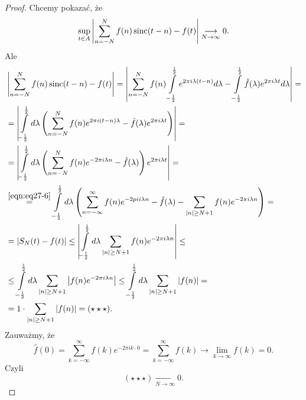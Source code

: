 \documentclass[../main.tex]{subfiles}
\begin{document}
\begin{proof}
    Chcemy pokazać, że
    \[
        \underset{t\in A}{\sup} \left| \sum_{n=-N}^{N} f(n) \operatorname{sinc}(t-n) - f(t) \right| \underset{N\to\infty}{\longrightarrow} 0
    .\]
Ale
\begin{align*}
    &\left| \sum_{n=-N}^{N} f(n) \operatorname{sinc}(t-n) - f(t) \right| = \left| \sum_{n=-N}^{N} f(n) \int\limits_{-\frac{1}{2}}^{\frac{1}{2}} e^{2\pi i \lambda (t-n)}d\lambda - \int\limits_{-\frac{1}{2}}^{\frac{1}{2}} \hat{f}(\lambda)e^{2\pi i \lambda t} d\lambda \right| = \\
    &= \left| \int\limits_{-\frac{1}{2}}^{\frac{1}{2}} d\lambda \left( \sum_{n=-N}^{N} f(n)e^{2\pi i (t - n)\lambda} - \hat{f}(\lambda)e^{2\pi i \lambda t}\right)   \right| = \\
    &= \left| \int\limits_{-\frac{1}{2}}^{\frac{1}{2}} d\lambda \left( \sum_{n=-N}^{N} f(n)e^{- 2\pi i \lambda n} - \hat{f}(\lambda) \right) e^{2\pi i \lambda t}  \right| = \\
    & \overset{\eqref{eqn:eq27-6}}{=} \int\limits_{-\frac{1}{2}}^{\frac{1}{2}} d\lambda \left( \sum_{n=-\infty}^{\infty} f(n) e^{-2pi i \lambda n} - \hat{f}(\lambda) - \sum_{|n| \ge N + 1} f(n) e^{-2\pi i \lambda n} \right) = \\
    &= \left| S_N(t) - f(t) \right| \le \left| \int\limits_{-\frac{1}{2}}^{\frac{1}{2}} d\lambda \sum_{|n| \ge N + 1} f(n)e^{-2\pi i \lambda n}  \right| \le\\
    &\le \int\limits_{-\frac{1}{2}}^{\frac{1}{2}} d\lambda \sum_{|n| \ge N + 1} \left| f(n) e^{-2\pi i \lambda n} \right| \le \int\limits_{-\frac{1}{2}}^{\frac{1}{2}} d\lambda \sum_{|n| \ge N + 1} \left| f(n) \right| =\\
    &= 1 \cdot \sum_{|n| \ge N + 1}\left| f(n) \right| = (\star\star\star)
.\end{align*}
Zauważmy, że
\[
    \hat{f}(0) = \sum_{k = -\infty}^{\infty} f(k) e^{-2\pi i k \cdot 0}= \sum_{k = -\infty}^{\infty} f(k) \to \lim_{k \to \infty}f(k) = 0
.\]
Czyli
\[
    (\star\star\star) \underset{N\to \infty}{\longrightarrow} 0
.\]
\end{proof}
\end{document}
